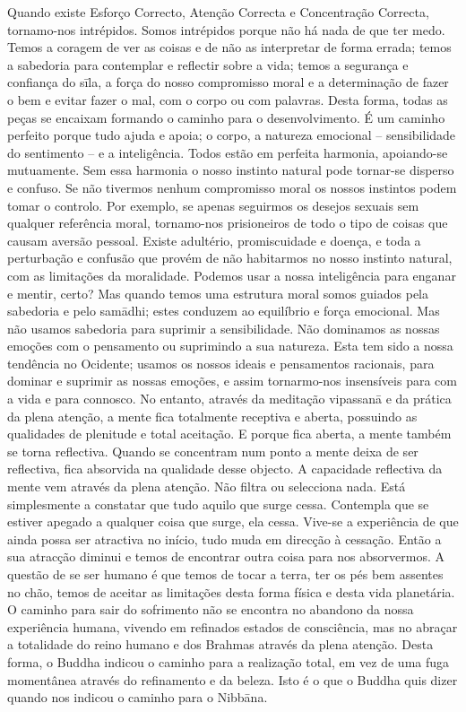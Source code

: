 Quando existe Esforço Correcto, Atenção Correcta e
Concentração Correcta, tornamo-nos intrépidos. Somos
intrépidos porque não há nada de que ter medo. Temos a
coragem de ver as coisas e de não as interpretar de forma
errada; temos a sabedoria para contemplar e reflectir sobre a
vida; temos a segurança e confiança do sīla, a força do nosso
compromisso moral e a determinação de fazer o bem e evitar
fazer o mal, com o corpo ou com palavras. Desta forma, todas
as peças se encaixam formando o caminho para o desenvolvimento. É um caminho perfeito porque tudo ajuda e apoia; o
corpo, a natureza emocional – sensibilidade do sentimento –
e a inteligência. Todos estão em perfeita harmonia, apoiando-se
mutuamente.
Sem essa harmonia o nosso instinto natural pode tornar-se
disperso e confuso. Se não tivermos nenhum compromisso
moral os nossos instintos podem tomar o controlo. Por
exemplo, se apenas seguirmos os desejos sexuais sem qualquer
referência moral, tornamo-nos prisioneiros de todo o tipo de
coisas que causam aversão pessoal. Existe adultério,
promiscuidade e doença, e toda a perturbação e confusão que
provém de não habitarmos no nosso instinto natural, com as
limitações da moralidade.
Podemos usar a nossa inteligência para enganar e mentir,
certo? Mas quando temos uma estrutura moral somos guiados
pela sabedoria e pelo samādhi; estes conduzem ao equilíbrio
e força emocional. Mas não usamos sabedoria para suprimir
a sensibilidade. Não dominamos as nossas emoções com o
pensamento ou suprimindo a sua natureza. Esta tem sido a
nossa tendência no Ocidente; usamos os nossos ideais e
pensamentos racionais, para dominar e suprimir as nossas
emoções, e assim tornarmo-nos insensíveis para com a vida e
para connosco.
No entanto, através da meditação vipassanā e da prática
da plena atenção, a mente fica totalmente receptiva e aberta,
possuindo as qualidades de plenitude e total aceitação. E
porque fica aberta, a mente também se torna reflectiva.
Quando se concentram num ponto a mente deixa de ser
reflectiva, fica absorvida na qualidade desse objecto. A
capacidade reflectiva da mente vem através da plena atenção.
Não filtra ou selecciona nada. Está simplesmente a constatar
que tudo aquilo que surge cessa. Contempla que se estiver
apegado a qualquer coisa que surge, ela cessa. Vive-se a
experiência de que ainda possa ser atractiva no início, tudo
muda em direcção à cessação. Então a sua atracção diminui e
temos de encontrar outra coisa para nos absorvermos.
A questão de se ser humano é que temos de tocar a terra,
ter os pés bem assentes no chão, temos de aceitar as limitações
desta forma física e desta vida planetária. O caminho para
sair do sofrimento não se encontra no abandono da nossa
experiência humana, vivendo em refinados estados de consciência, mas no abraçar a totalidade do reino humano e dos
Brahmas através da plena atenção. Desta forma, o Buddha
indicou o caminho para a realização total, em vez de uma
fuga momentânea através do refinamento e da beleza. Isto é o
que o Buddha quis dizer quando nos indicou o caminho para
o Nibbāna.

